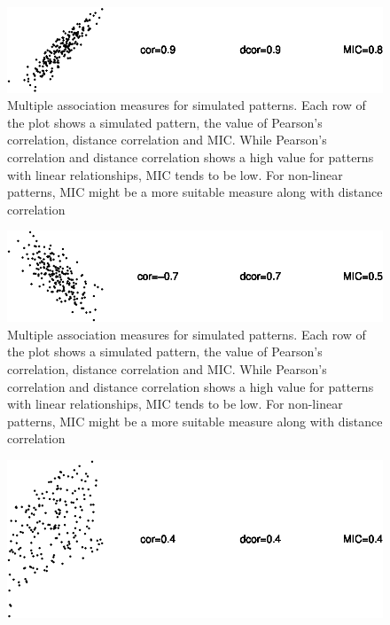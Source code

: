 \begin{Schunk}
\begin{figure}

{\centering \includegraphics{rj_paper_files/figure-latex/motivation1-1} 

}

\caption[Multiple association measures for simulated patterns]{Multiple association measures for simulated patterns. Each row of the plot shows a simulated pattern, the value of Pearson's correlation, distance correlation and MIC. While Pearson's correlation and distance correlation shows a high value for patterns with linear relationships, MIC tends to be low. For non-linear patterns, MIC might be a more suitable measure along with distance correlation}\label{fig:motivation1-1}
\end{figure}
\begin{figure}

{\centering \includegraphics{rj_paper_files/figure-latex/motivation1-2} 

}

\caption[Multiple association measures for simulated patterns]{Multiple association measures for simulated patterns. Each row of the plot shows a simulated pattern, the value of Pearson's correlation, distance correlation and MIC. While Pearson's correlation and distance correlation shows a high value for patterns with linear relationships, MIC tends to be low. For non-linear patterns, MIC might be a more suitable measure along with distance correlation}\label{fig:motivation1-2}
\end{figure}
\begin{figure}

{\centering \includegraphics{rj_paper_files/figure-latex/motivation1-3} 

}
\end{figure}
\end{Schunk}
